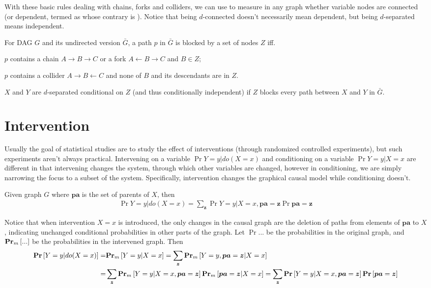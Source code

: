 \documentclass{article}
\newcommand \Prm[1]		{\bt{Pr}_{m} \left[ #1 \right]}
\begin{document}
With these basic rules dealing with chains, forks and colliders, we can use  to measure in any graph whether variable nodes are connected (or dependent, termed as  whose contrary is ). Notice that being $d$-connected doesn't necessarily mean dependent, but being $d$-separated means independent.

	For DAG $G$ and its undirected version $\bar{G}$, a path $p$ in $\bar{G}$ is blocked by a set of nodes $Z$ iff.
	
	 $p$ contains a chain $A\to B\to C$ or a fork $A \leftarrow B \to C$ and $B\in Z$;
	
	 $p$ contains a collider $A \to B \leftarrow C$ and none of $B$ and its descendants are in $Z$.

	$X$ and $Y$ are $d$-separated conditional on $Z$ (and thus conditionally independent) if $Z$ blocks every path between $X$ and $Y$ in $\bar{G}$.
	
\section{Intervention}

Usually the goal of statistical studies are to study the effect of interventions (through randomized controlled experiments), but such experiments aren't always practical. Intervening on a variable $\Pr{Y=y|do(X=x)}$ and conditioning on a variable $\Pr{Y=y|X=x}$ are different in that intervening changes the system, through which other variables are changed, however in conditioning, we are simply narrowing the focus to a subset of the system. Specifically, intervention changes the graphical causal model while conditioning doesn't.

	Given graph $G$ where $\bm{pa}$ is the set of parents of $X$, then
	\begin{align*}
		\Pr{Y=y|do(X=x)} = \sum_{\bm{z}} \Pr{Y=y|X=x,\bm{pa}=\bm{z}} \Pr{\bm{pa}=\bm{z}}
	\end{align*}

\Proof
	Notice that when intervention $X=x$ is introduced, the only changes in the causal graph are the deletion of paths from elements of $\bm{pa}$ to $X$, indicating unchanged conditional probabilities in other parts of the graph. Let $\Pr{...}$ be the probabilities in the original graph, and $\Prm{...}$ be the probabilities in the intervened graph. Then
	\begin{align*}
		\Pr{Y=y|do(X=x)} =& \Prm{Y=y|X=x} = \sum_{\bm{z}} \Prm{Y=y, \bm{pa}=\bm{z}|X=x}
		\\
		=& \sum_{\bm{z}} \Prm{Y=y|X=x, \bm{pa}=\bm{z}} \Prm{\bm{pa}=\bm{z}|X=x}
		=\sum_{\bm{z}} \Pr{Y=y|X=x,\bm{pa}=\bm{z}} \Pr{\bm{pa}=\bm{z}}
	\end{align*}
\QED
\end{document}
